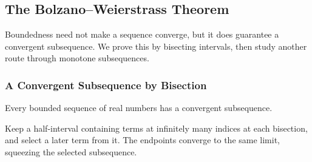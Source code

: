 \subsection{The Bolzano--Weierstrass Theorem}
Boundedness need not make a sequence converge, but it does guarantee a
convergent subsequence. We prove this by bisecting intervals, then study
another route through monotone subsequences.

\subsubsection{A Convergent Subsequence by Bisection}
\begin{theorem}\label{thm:bolzano-weierstrass}
    Every bounded sequence of real numbers has a convergent subsequence.
\end{theorem}
\begin{idea}
    Keep a half-interval containing terms at infinitely many indices at
    each bisection, and select a later term from it. The endpoints converge
    to the same limit, squeezing the selected subsequence.
\end{idea}
